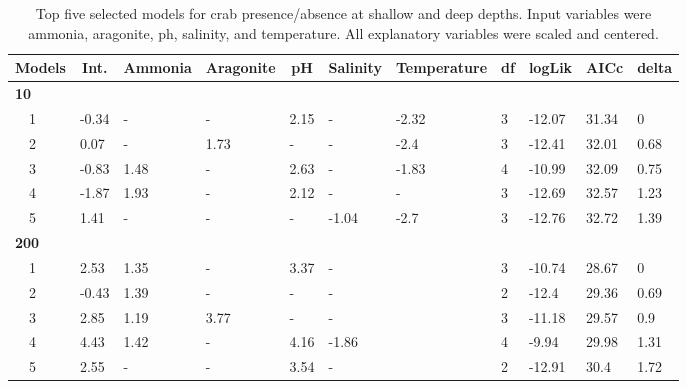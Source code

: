 \documentclass[letterpaper,12pt]{article}\usepackage[]{graphicx}\usepackage[]{color}
\begin{document}
\begin{table}[!tbp]
{\footnotesize
\caption{Top five selected models for crab presence/absence at shallow and deep depths. Input variables were ammonia, aragonite, ph, salinity, and temperature. All explanatory variables were scaled and centered.\label{tab:patab}} 
\begin{center}
\begin{tabular}{lllllllllll}
\hline\hline
\multicolumn{1}{l}{Models}&\multicolumn{1}{c}{Int.}&\multicolumn{1}{c}{Ammonia}&\multicolumn{1}{c}{Aragonite}&\multicolumn{1}{c}{pH}&\multicolumn{1}{c}{Salinity}&\multicolumn{1}{c}{Temperature}&\multicolumn{1}{c}{df}&\multicolumn{1}{c}{logLik}&\multicolumn{1}{c}{AICc}&\multicolumn{1}{c}{delta}\tabularnewline
\hline
{\bfseries 10}&&&&&&&&&&\tabularnewline
~~1&-0.34&-&-&2.15&-&-2.32&3&-12.07&31.34&0\tabularnewline
~~2&0.07&-&1.73&-&-&-2.4&3&-12.41&32.01&0.68\tabularnewline
~~3&-0.83&1.48&-&2.63&-&-1.83&4&-10.99&32.09&0.75\tabularnewline
~~4&-1.87&1.93&-&2.12&-&-&3&-12.69&32.57&1.23\tabularnewline
~~5&1.41&-&-&-&-1.04&-2.7&3&-12.76&32.72&1.39\tabularnewline
\hline
{\bfseries 200}&&&&&&&&&&\tabularnewline
~~1&2.53&1.35&-&3.37&-&&3&-10.74&28.67&0\tabularnewline
~~2&-0.43&1.39&-&-&-&&2&-12.4&29.36&0.69\tabularnewline
~~3&2.85&1.19&3.77&-&-&&3&-11.18&29.57&0.9\tabularnewline
~~4&4.43&1.42&-&4.16&-1.86&&4&-9.94&29.98&1.31\tabularnewline
~~5&2.55&-&-&3.54&-&&2&-12.91&30.4&1.72\tabularnewline
\hline
\end{tabular}\end{center}}
\end{table}
\end{document}
